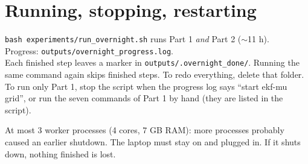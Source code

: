 \documentclass[11pt,a4paper]{article}
\begin{document}
\section{Running, stopping, restarting}
\begin{code}
\texttt{bash experiments/run\_overnight.sh} \quad runs Part 1 \emph{and} Part 2 ($\sim$11 h).\\
Progress: \texttt{outputs/overnight\_progress.log}.\\
Each finished step leaves a marker in \texttt{outputs/.overnight\_done/}. Running the same command again skips finished
steps. To redo everything, delete that folder.\\
To run only Part 1, stop the script when the progress log says ``start ekf-mu grid'', or run the seven commands of
Part 1 by hand (they are listed in the script).
\end{code}
\begin{warn}
At most 3 worker processes (4 cores, 7 GB RAM): more processes probably caused an earlier shutdown. The laptop must stay
on and plugged in. If it shuts down, nothing finished is lost.
\end{warn}

\end{document}
